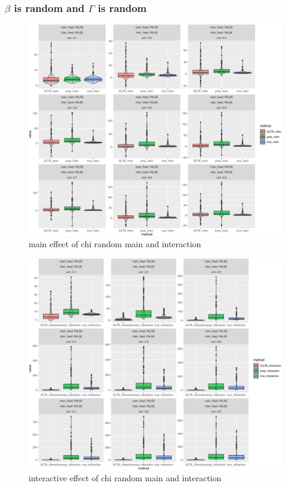 \documentclass[]{article}
\begin{document}
\clearpage

\subsubsection{\texorpdfstring{\(\beta\) is random and \(\Gamma\) is
random}{\textbackslash{}beta is random and \textbackslash{}Gamma is random}}\label{beta-is-random-and-gamma-is-random-1}

\begin{figure}
\centering
\includegraphics{Simulation_report_files/figure-latex/main_random_random_chi-1.pdf}
\caption{main effect of chi random main and interaction}
\end{figure}

\begin{figure}
\centering
\includegraphics{Simulation_report_files/figure-latex/inter_random_random_chi-1.pdf}
\caption{interactive effect of chi random main and interaction}
\end{figure}
\end{document}
